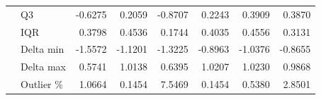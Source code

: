 \begin{tabular}{llrrrrrr}
 & Q3 & {\cellcolor[HTML]{F8D7DA}} -0.6275 & {\cellcolor[HTML]{F8D7DA}} 0.2059 & {\cellcolor[HTML]{F8D7DA}} -0.8707 & {\cellcolor[HTML]{F8D7DA}} 0.2243 & {\cellcolor[HTML]{F8D7DA}} 0.3909 & {\cellcolor[HTML]{F8D7DA}} 0.3870 \\
 & IQR & {\cellcolor[HTML]{F8D7DA}} 0.3798 & {\cellcolor[HTML]{F8D7DA}} 0.4536 & 0.1744 & 0.4035 & {\cellcolor[HTML]{F8D7DA}} 0.4556 & 0.3131 \\
 & Delta min & {\cellcolor[HTML]{F8D7DA}} -1.5572 & {\cellcolor[HTML]{F8D7DA}} -1.1201 & {\cellcolor[HTML]{F8D7DA}} -1.3225 & {\cellcolor[HTML]{F8D7DA}} -0.8963 & -1.0376 & -0.8655 \\
 & Delta max & {\cellcolor[HTML]{D1E7DD}} 0.5741 & 1.0138 & {\cellcolor[HTML]{D1E7DD}} 0.6395 & 1.0207 & {\cellcolor[HTML]{F8D7DA}} 1.0230 & {\cellcolor[HTML]{F8D7DA}} 0.9868 \\
 & Outlier \% & {\cellcolor[HTML]{F8D7DA}} 1.0664 & {\cellcolor[HTML]{D1E7DD}} 0.1454 & 7.5469 & {\cellcolor[HTML]{D1E7DD}} 0.1454 & {\cellcolor[HTML]{D1E7DD}} 0.5380 & {\cellcolor[HTML]{F8D7DA}} 2.8501 \\
\bottomrule
\end{tabular}